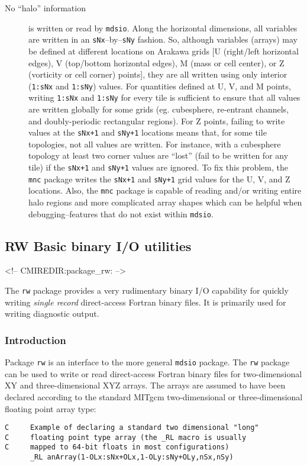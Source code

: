 \begin{description}
\item[No ``halo'' information] is written or read by \texttt{mdsio}.
  Along the horizontal dimensions, all variables are written in an
  \texttt{sNx}--by--\texttt{sNy} fashion.  So, although variables
  (arrays) may be defined at different locations on Arakawa grids [U
  (right/left horizontal edges), V (top/bottom horizontal edges), M
  (mass or cell center), or Z (vorticity or cell corner) points], they
  are all written using only interior (\texttt{1:sNx} and
  \texttt{1:sNy}) values.  For quantities defined at U, V, and M
  points, writing \texttt{1:sNx} and \texttt{1:sNy} for every tile is
  sufficient to ensure that all values are written globally for some
  grids (eg. cubesphere, re-entrant channels, and doubly-periodic
  rectangular regions).  For Z points, failing to write values at the
  \texttt{sNx+1} and \texttt{sNy+1} locations means that, for some
  tile topologies, not all values are written.  For instance, with a
  cubesphere topology at least two corner values are ``lost'' (fail to
  be written for any tile) if the \texttt{sNx+1} and \texttt{sNy+1}
  values are ignored.  To fix this problem, the \texttt{mnc} package
  writes the \texttt{sNx+1} and \texttt{sNy+1} grid values for the U,
  V, and Z locations.  Also, the \texttt{mnc} package is capable of
  reading and/or writing entire halo regions and more complicated
  array shapes which can be helpful when debugging--features that
  do not exist within \texttt{mdsio}.
\end{description}


\subsection{RW Basic binary I/O utilities}
\label{sec:pkg:rw}
\begin{rawhtml}
<!-- CMIREDIR:package_rw: -->
\end{rawhtml}

The {\tt rw} package provides a very rudimentary binary I/O capability
for quickly writing {\it single record} direct-access Fortran binary files.
It is primarily used for writing diagnostic output.

\subsubsection{Introduction}
Package {\tt rw} is an interface to the more general {\tt mdsio} package.
The {\tt rw} package can be used to write or read direct-access Fortran
binary files for two-dimensional XY and three-dimensional XYZ arrays.
The arrays are assumed to have been declared according to the standard
MITgcm two-dimensional or three-dimensional floating point array type:
\begin{verbatim}
C     Example of declaring a standard two dimensional "long"
C     floating point type array (the _RL macro is usually
C     mapped to 64-bit floats in most configurations)
      _RL anArray(1-OLx:sNx+OLx,1-OLy:sNy+OLy,nSx,nSy)
\end{verbatim}

